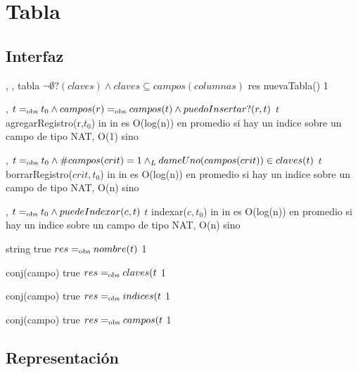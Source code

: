 \section{Tabla}

\subsection{Interfaz}

\iusa{}

\ioperaciones

{   ,
    ,
    } %
{tabla} %
{$\neg\emptyset?(claves) \land claves \subseteq campos(columnas)$} %
{res \igobs nuevaTabla()} %
{1} %
{} %
{} %

{   ,
    }
{}
{$t =_{\mathrm{obs}} t_0 \land campos(r) =_{\mathrm{obs}} campos(t) \land puedoInsertar?(r,t)$}
{$t$ \igobs agregarRegistro(r,$t_0$)}
{in}
{}
{in es O(log(n)) en promedio si hay un indice sobre un campo de tipo NAT, O(1) sino}

{   ,
    }
{}
{$t =_{\mathrm{obs}} t_0 \land \#campos(crit) = 1 \land_L dameUno(campos(crit)) \in claves(t)$}
{$t$ \igobs borrarRegistro($crit,t_0$)}
{in}
{}
{in es O(log(n)) en promedio si hay un indice sobre un campo de tipo NAT, O(n) sino}

{   ,
    }
{}
{$t =_{\mathrm{obs}} t_0 \land puedeIndexar(c,t)$}
{$t$ \igobs indexar($c,t_0$)}
{in}
{}
{in es O(log(n)) en promedio si hay un indice sobre un campo de tipo NAT, O(n) sino}

{   }
{string}
{true}
{$res =_{\mathrm{obs}} nombre(t)$}
{1}
{}
{}

{   }
{conj(campo)}
{true}
{$res =_{\mathrm{obs}} claves(t$}
{1}
{}
{}

{   }
{conj(campo)}
{true}
{$res =_{\mathrm{obs}} indices(t$}
{1}
{}
{}

{   }
{conj(campo)}
{true}
{$res =_{\mathrm{obs}} campos(t$}
{1}
{}
{}

\subsection{Representación}

